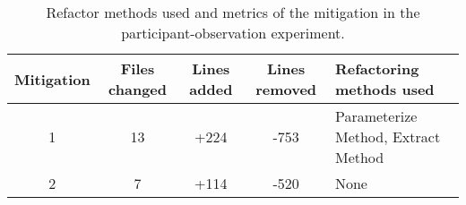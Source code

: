 \begin{table}
\begin{tabular}{ | c | c | c | c | m{6em} | }

\hline

\textbf{Mitigation} & \textbf{Files changed} & \textbf{Lines added} & \textbf{Lines removed} & \textbf{Refactoring methods used}
\\ \hline 

1 & 13 & +224 & -753 & Parameterize Method, Extract Method  \\ \hline
2 & 7 & +114 & -520 & None \\ \hline

\hline
\end{tabular}
\caption{Refactor methods used and metrics of the mitigation in the participant-observation experiment.}
\label{tab:patch}
\end{table}
